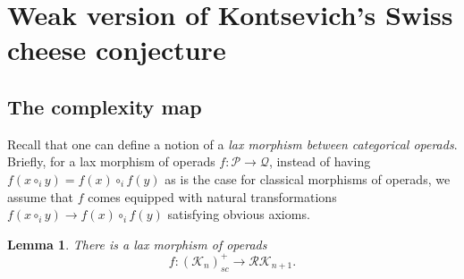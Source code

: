 \documentclass[]{amsart}
\newtheorem{lemma}[theorem]{Lemma}
\theoremstyle{definition}
\begin{document}
\section{Weak version of Kontsevich's Swiss cheese conjecture}\label{sectionkontsevichconjecture}

\subsection{The complexity map}

Recall \cite[Definition 4.1]{weberoperads} that one can define a notion of a \emph{lax morphism between categorical operads}. Briefly, for a lax morphism of operads $f: \mathcal{P} \to \mathcal{Q}$, instead of having $f(x \circ_i y) = f(x) \circ_i f(y)$ as is the case for classical morphisms of operads, we assume that $f$ comes equipped with natural transformations $f(x \circ_i y) \to f(x) \circ_i f(y)$ satisfying obvious axioms.



\begin{lemma}\label{lemmaexistencecomplexitymap}
	There is a lax morphism of operads
	\begin{equation}\label{equationmapc}
		f: (\mathcal{K}_n)_{sc}^+ \to \mathcal{RK}_{n+1}.
	\end{equation}
\end{lemma}
\end{document}
